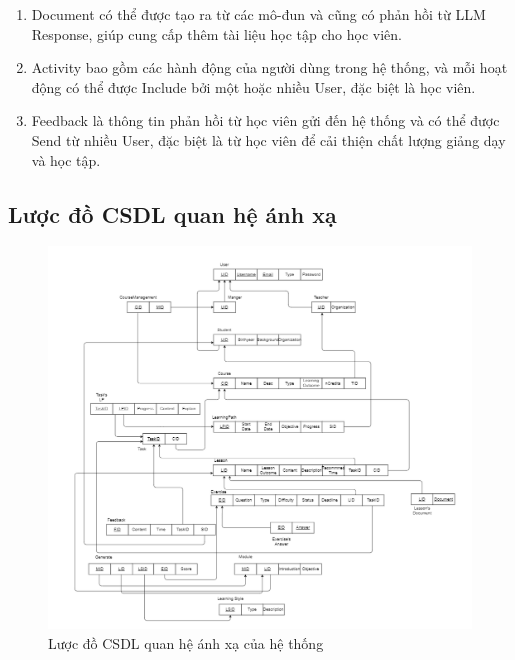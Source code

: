 \begin{enumerate}
    \item Document có thể được tạo ra từ các mô-đun và cũng có phản hồi từ LLM Response, giúp cung cấp thêm tài liệu học tập cho học viên.
    \item Activity bao gồm các hành động của người dùng trong hệ thống, và mỗi hoạt động có thể được Include bởi một hoặc nhiều User, đặc biệt là học viên.
    \item Feedback là thông tin phản hồi từ học viên gửi đến hệ thống và có thể được Send từ nhiều User, đặc biệt là từ học viên để cải thiện chất lượng giảng dạy và học tập.
\end{enumerate}
\newpage
\subsection{Lược đồ CSDL quan hệ ánh xạ}
\begin{figure}[h!]
    \centering
    \includegraphics[width=\linewidth]{Images/Anh/mapping.png}
    \caption{Lược đồ CSDL quan hệ ánh xạ của hệ thống}
    \label{fig:enter-label}
\end{figure}
\newpage

